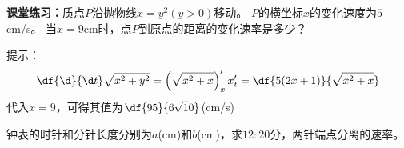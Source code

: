 \bs
{\bf 课堂练习：}质点$P$沿抛物线$x=y^2(y>0)$移动。
$P$的横坐标$x$的变化速度为$5$cm/s。
当$x=9$cm时，点$P$到原点的距离的变化速率是多少？

\ifhint 
 提示：
 $$\df{\d}{\d t}\sqrt{x^2+y^2}=\left(\sqrt{x^2+x}\right)'_xx'_t
 =\df{5(2x+1)}{\sqrt{x^2+x}}$$
 代入$x=9$，可得其值为$\df{95}{6\sqrt10}$(cm/s)
 \fi

\bs
\egz 钟表的时针和分针长度分别为$a$(cm)和$b$(cm)，求$12:20$分，两针端点分离的速率。


